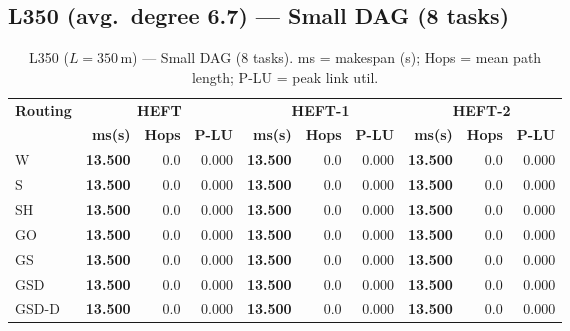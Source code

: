 \documentclass[11pt]{article}
\newcommand{\win}[1]{\textcolor{green!50!black}{\textbf{#1}}}
\begin{document}
\subsection{L350 (avg.\ degree 6.7) --- Small DAG (8 tasks)}
\begin{table}[H]
\centering\small
\begin{tabular}{l r r r r r r r r r}
\toprule
\textbf{Routing} & \multicolumn{3}{c}{\textbf{HEFT}} & \multicolumn{3}{c}{\textbf{HEFT-1}} & \multicolumn{3}{c}{\textbf{HEFT-2}} \\
\cmidrule(lr){2-4}\cmidrule(lr){5-7}\cmidrule(lr){8-10}
& \textbf{ms(s)} & \textbf{Hops} & \textbf{P-LU} & \textbf{ms(s)} & \textbf{Hops} & \textbf{P-LU} & \textbf{ms(s)} & \textbf{Hops} & \textbf{P-LU} \\
\midrule
  W & \win{13.500} & 0.0 & 0.000 & \win{13.500} & 0.0 & 0.000 & \win{13.500} & 0.0 & 0.000 \\
  S & \win{13.500} & 0.0 & 0.000 & \win{13.500} & 0.0 & 0.000 & \win{13.500} & 0.0 & 0.000 \\
  SH & \win{13.500} & 0.0 & 0.000 & \win{13.500} & 0.0 & 0.000 & \win{13.500} & 0.0 & 0.000 \\
  GO & \win{13.500} & 0.0 & 0.000 & \win{13.500} & 0.0 & 0.000 & \win{13.500} & 0.0 & 0.000 \\
  GS & \win{13.500} & 0.0 & 0.000 & \win{13.500} & 0.0 & 0.000 & \win{13.500} & 0.0 & 0.000 \\
  GSD & \win{13.500} & 0.0 & 0.000 & \win{13.500} & 0.0 & 0.000 & \win{13.500} & 0.0 & 0.000 \\
  GSD-D & \win{13.500} & 0.0 & 0.000 & \win{13.500} & 0.0 & 0.000 & \win{13.500} & 0.0 & 0.000 \\
\bottomrule
\end{tabular}
\caption{L350 ($L=350$\,m) --- Small DAG (8 tasks). ms = makespan (s); Hops = mean path length; P-LU = peak link util.}
\end{table}
\end{document}

